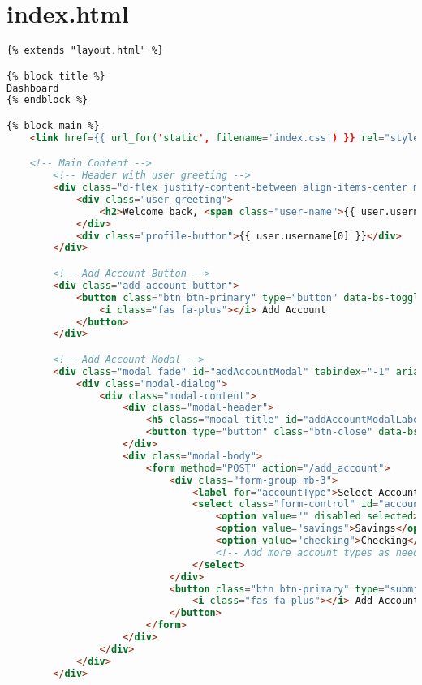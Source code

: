 \section{index.html}
\begin{lstlisting}[language=HTML]
{% extends "layout.html" %}

{% block title %}
Dashboard
{% endblock %}

{% block main %}
    <link href={{ url_for('static', filename='index.css') }} rel="stylesheet">

    <!-- Main Content -->
        <!-- Header with user greeting -->
        <div class="d-flex justify-content-between align-items-center mb-4">
            <div class="user-greeting">
                <h2>Welcome back, <span class="user-name">{{ user.username }}</span>!</h2>
            </div>
            <div class="profile-button">{{ user.username[0] }}</div>
        </div>

        <!-- Add Account Button -->
        <div class="add-account-button">
            <button class="btn btn-primary" type="button" data-bs-toggle="modal" data-bs-target="#addAccountModal">
                <i class="fas fa-plus"></i> Add Account
            </button>
        </div>

        <!-- Add Account Modal -->
        <div class="modal fade" id="addAccountModal" tabindex="-1" aria-labelledby="addAccountModalLabel" aria-hidden="true">
            <div class="modal-dialog">
                <div class="modal-content">
                    <div class="modal-header">
                        <h5 class="modal-title" id="addAccountModalLabel">Add New Account</h5>
                        <button type="button" class="btn-close" data-bs-dismiss="modal" aria-label="Close"></button>
                    </div>
                    <div class="modal-body">
                        <form method="POST" action="/add_account">
                            <div class="form-group mb-3">
                                <label for="accountType">Select Account Type</label>
                                <select class="form-control" id="accountType" name="account_type" required>
                                    <option value="" disabled selected>Select an account type</option>
                                    <option value="savings">Savings</option>
                                    <option value="checking">Checking</option>
                                    <!-- Add more account types as needed -->
                                </select>
                            </div>
                            <button class="btn btn-primary" type="submit">
                                <i class="fas fa-plus"></i> Add Account
                            </button>
                        </form>
                    </div>
                </div>
            </div>
        </div>


\end{lstlisting}

